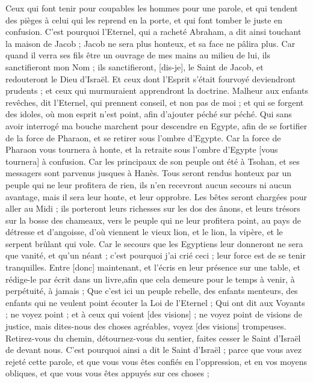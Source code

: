 \begin{multicols}{2}
Ceux qui font tenir pour coupables les hommes pour une parole, et qui tendent des pièges à celui qui les reprend en la porte, et qui font tomber le juste en confusion.
C'est pourquoi l'Eternel, qui a racheté Abraham, a dit ainsi touchant la maison de Jacob ; Jacob ne sera plus honteux, et sa face ne pâlira plus.
Car quand il verra ses fils être un ouvrage de mes mains au milieu de lui, ils sanctifieront mon Nom ; ils sanctifieront, [dis-je], le Saint de Jacob, et redouteront le Dieu d'Israël.
Et ceux dont l'Esprit s'était fourvoyé deviendront prudents ; et ceux qui murmuraient apprendront la doctrine.
\VerseOne{}Malheur aux enfants revêches, dit l'Eternel, qui prennent conseil, et non pas de moi ; et qui se forgent des idoles, où mon esprit n'est point, afin d'ajouter péché sur péché.
Qui sans avoir interrogé ma bouche marchent pour descendre en Egypte, afin de se fortifier de la force de Pharaon, et se retirer sous l'ombre d'Egypte.
Car la force de Pharaon vous tournera à honte, et la retraite sous l'ombre d'Egypte [vous tournera] à confusion.
Car les principaux de son peuple ont été à Tsohan, et ses messagers sont parvenus jusques à Hanès.
Tous seront rendus honteux par un peuple qui ne leur profitera de rien, ils n'en recevront aucun secours ni aucun avantage, mais il sera leur honte, et leur opprobre.
Les bêtes seront chargées pour aller au Midi ; ils porteront leurs richesses sur les dos des ânons, et leurs trésors sur la bosse des chameaux, vers le peuple qui ne leur profitera point, au pays de détresse et d'angoisse, d'où viennent le vieux lion, et le lion, la vipère, et le serpent brûlant qui vole.
Car le secours que les Egyptiens leur donneront ne sera que vanité, et qu'un néant ; c'est pourquoi j'ai crié ceci ; leur force est de se tenir tranquilles.
Entre [donc] maintenant, et l'écris en leur présence sur une table, et rédige-le par écrit dans un livre,afin que cela demeure pour le temps à venir, à perpétuité, à jamais ;
Que c'est ici un peuple rebelle, des enfants menteurs, des enfants qui ne veulent point écouter la Loi de l'Eternel ;
Qui ont dit aux Voyants ; ne voyez point ; et à ceux qui voient [des visions] ; ne voyez point de visions de justice, mais dites-nous des choses agréables, voyez [des visions] trompeuses.
Retirez-vous du chemin, détournez-vous du sentier, faites cesser le Saint d'Israël de devant nous.
C'est pourquoi ainsi a dit le Saint d'Israël ; parce que vous avez rejeté cette parole, et que vous vous êtes confiés en l'oppression, et en vos moyens obliques, et que vous vous êtes appuyés sur ces choses ;

\end{multicols}

